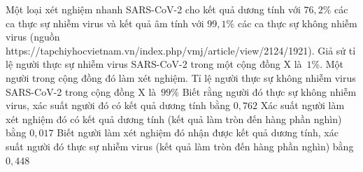 \begin{ex}%
	Một loại xét nghiệm nhanh SARS-CoV-2 cho kết quả dương tính với $76{,}2\%$ các ca thực sự nhiễm virus và kết quả âm tính với $99{,}1\%$ các ca thực sự không nhiễm virus (nguồn https://tapchiyhocvietnam.vn/index.php/vmj/article/view/2124/1921). Giả sử tỉ lệ người thực sự nhiễm virus SARS-CoV-2 trong một cộng  đồng X là~$1\%$. Một người trong cộng đồng đó làm xét nghiệm.
	\choiceTF 
		{\True Tỉ lệ người thực sự  không nhiễm virus SARS-CoV-2 trong cộng đồng X là~$99\%$}
		{Biết rằng người đó thực sự không nhiễm virus, xác suất người  đó có kết quả dương tính bằng $0{,}762$}
		{\True Xác suất người làm xét nghiệm đó có  kết quả dương tính (kết quả làm tròn đến hàng phần nghìn) bằng $0{,}017$}
		{\True Biết người làm xét nghiệm đó nhận được kết quả dương tính, xác suất người đó thực sự nhiễm  virus (kết quả làm tròn đến hàng phần nghìn) bằng $0{,}448$}
\end{ex}

